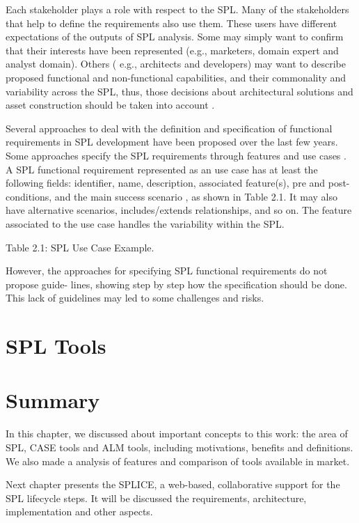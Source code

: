 Each stakeholder plays a role with respect to the \ac{SPL}. Many of the stakeholders
that help to define the requirements also use them. These users have different expectations of 
the outputs of \ac{SPL} analysis. Some may simply want to confirm that their interests have been represented 
(e.g., marketers, domain expert and analyst domain). Others ( e.g., architects and developers) may want to 
describe proposed functional and non-functional capabilities, and their commonality and variability across 
the \ac{SPL}, thus, those decisions about architectural solutions and asset construction should be taken into account 
\citep{chastek2001product}.

Several approaches to deal with the definition and specification of functional
requirements in \ac{SPL} development have been proposed over the last few years. Some approaches specify 
the \ac{SPL} requirements through features and use cases
\citep{griss1998integrating, bayer2000customizable, moon2005approach,
eriksson2005pluss, bonifacio2009modeling, alferez2011supporting,
mussbacher2012aourn, shaker2012feature}.
A \ac{SPL} functional requirement represented as an use case has at least the following fields: identifier, name, 
description, associated feature(s), pre and post-conditions, and the main
success scenario , as shown in Table 2.1. It may also have alternative
scenarios, includes/extends relationships, and so on. The feature associated to the use case handles the variability within the \ac{SPL}.

Table 2.1: SPL Use Case Example.

However, the approaches for specifying \ac{SPL} functional requirements do not propose guide- lines, 
showing step by step how the specification should be done. This lack of guidelines may led to some 
challenges and risks.

\section{SPL Tools}
\label{sc:spltools}

\section{Summary}
\label{sc:summary}
In this chapter, we discussed about important concepts to this work: the area of \acf{SPL}, \acf{CASE} tools and \acf{ALM} tools, including motivations, benefits and definitions. We also made a analysis of features and comparison of tools available in market.

Next chapter presents the \acf{SPLICE}, a web-based, collaborative support for the \ac{SPL} lifecycle steps. It will be discussed the requirements, architecture, implementation and other aspects.

